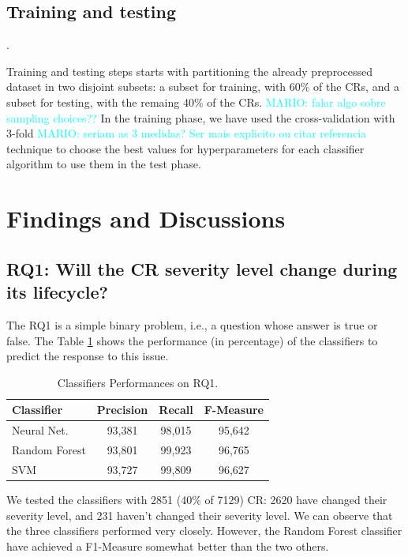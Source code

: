 \documentclass[10pt, conference]{IEEEtran}
\newcommand{\mario}[1]{\noindent\textcolor{cyan}{MARIO: {#1}}}
\newcommand{\mario}[1]{}
\begin{document}
\subsection{Training and testing}.  	\label{subsec:training}

Training and testing steps starts with partitioning the already preprocessed dataset in two disjoint subsets: a subset for training, with 60\% of the CRs, and a subset for testing, with the remaing 40\% of the CRs. \mario{falar algo sobre sampling choices??} In the training phase, we have used the cross-validation with 3-fold \mario{seriam as 3 medidas? Ser mais explicito ou citar referencia} technique\cite{Zhao2013} to choose the best values for hyperparameters for each classifier algorithm to use them in the test phase. 


\section{Findings and Discussions}  \label{sec:discussion}

\subsection{RQ1: Will the CR severity level change during its lifecycle?}

The RQ1 is a simple binary problem, i.e., a question whose answer is true or false. The Table \ref{tab:metrics_for_rq1} shows the performance (in percentage) of the classifiers to predict the response to this issue.


\begin{table}[!ht]
	\renewcommand{\arraystretch}{1.5}
	\caption{Classifiers Performances on RQ1.}
	\label{tab:metrics_for_rq1}
	\centering
	\begin{tabular}{|l|c|c|c|}
		\hline
		Classifier & Precision & Recall & F-Measure\\
		\hline 
		Neural Net. & 93,381 & 98,015 & 95,642\\
		\hline
		Random Forest & 93,801 & 99,923 & 96,765\\
        \hline
		SVM & 93,727 & 99,809 & 96,627 \\
		\hline
		
	\end{tabular}
\end{table}

We tested the classifiers with 2851 (40\% of 7129) CR: 2620 have changed their severity level, and 231 haven't changed their severity level. We can observe that the three classifiers performed very closely. However, the Random Forest classifier have achieved a F1-Measure somewhat better than the two others. 
\end{document}
